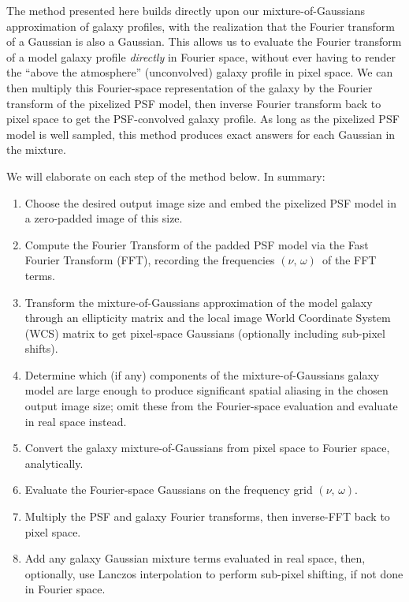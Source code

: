 \documentclass[11pt,preprint]{aastex}
\newcommand{\pixelfreqs}{$(\nu,\, \omega)$}
\begin{document}
The method presented here builds directly upon our mixture-of-Gaussians
approximation of galaxy profiles, with the realization that the
Fourier transform of a Gaussian is also a Gaussian.  This allows us to
evaluate the Fourier transform of a model galaxy profile \emph{directly} in Fourier
space, without ever having to render the ``above the atmosphere''
(unconvolved) galaxy profile in pixel space.
We can then multiply this Fourier-space
representation of the galaxy by the Fourier transform of the pixelized
PSF model, then inverse Fourier transform back to pixel space to get
the PSF-convolved galaxy profile.
%
As long as the pixelized PSF model is well sampled, this method produces
exact answers for each Gaussian in the mixture.

We will elaborate on each step of the method below.  In summary:
\begin{enumerate}
\item Choose the desired output image size and embed the pixelized PSF
  model in a zero-padded image of this size.
\item Compute the Fourier Transform of the padded PSF model via the
  Fast Fourier Transform (FFT),
  recording the frequencies \pixelfreqs\ of the FFT terms.
\item Transform the mixture-of-Gaussians approximation of the model
  galaxy through an ellipticity matrix and the local image World
  Coordinate System (WCS) matrix to get pixel-space Gaussians
  (optionally including sub-pixel shifts).
\item Determine which (if any) components of the mixture-of-Gaussians
  galaxy model are large enough to produce significant spatial
  aliasing in the chosen output image size; omit these from the
  Fourier-space evaluation and evaluate in real space instead.
\item Convert the galaxy mixture-of-Gaussians from pixel space to Fourier space,
  analytically.
\item Evaluate the Fourier-space Gaussians on the frequency grid \pixelfreqs.
\item Multiply the PSF and galaxy Fourier transforms, then inverse-FFT
  back to pixel space.
\item Add any galaxy Gaussian mixture terms evaluated in real space,
  then, optionally, use Lanczos interpolation to perform sub-pixel
  shifting, if not done in Fourier space.
\end{enumerate}
\end{document}

